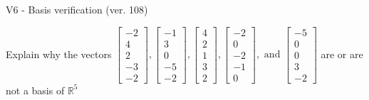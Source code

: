 \begin{exercise}
  \begin{exerciseTitle}V6 - Basis verification (ver. 108)\end{exerciseTitle}
  \begin{exerciseStatement}
    Explain why the vectors \(\left[\begin{array}{r}
-2 \\
4 \\
2 \\
-3 \\
-2
\end{array}\right] , \left[\begin{array}{r}
-1 \\
3 \\
0 \\
-5 \\
-2
\end{array}\right] , \left[\begin{array}{r}
4 \\
2 \\
1 \\
3 \\
2
\end{array}\right] , \left[\begin{array}{r}
-2 \\
0 \\
-2 \\
-1 \\
0
\end{array}\right] , \text{ and } \left[\begin{array}{r}
-5 \\
0 \\
0 \\
3 \\
-2
\end{array}\right]\) are or are not a basis of \(\mathbb{R}^5\)	



\end{exerciseStatement}
\end{exercise}
